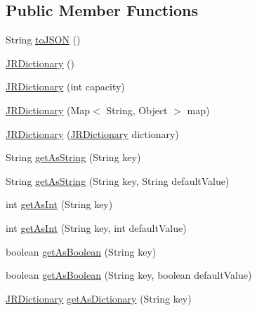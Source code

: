 \subsection*{Public Member Functions}
\begin{DoxyCompactItemize}
\item 
String \hyperlink{classcom_1_1janrain_1_1android_1_1engage_1_1types_1_1_j_r_dictionary_a693608dec873ba750e1bf45f50d81817}{toJSON} ()
\item 
\hyperlink{classcom_1_1janrain_1_1android_1_1engage_1_1types_1_1_j_r_dictionary_a3d6b06229461e0972db38b25eae82c53}{JRDictionary} ()
\item 
\hyperlink{classcom_1_1janrain_1_1android_1_1engage_1_1types_1_1_j_r_dictionary_a80ee8f20b3006ddfbbaeee16fcc9cef4}{JRDictionary} (int capacity)
\item 
\hyperlink{classcom_1_1janrain_1_1android_1_1engage_1_1types_1_1_j_r_dictionary_a183efe63560b320550b6ee928ae3c7f1}{JRDictionary} (Map$<$ String, Object $>$ map)
\item 
\hyperlink{classcom_1_1janrain_1_1android_1_1engage_1_1types_1_1_j_r_dictionary_a4bc06064c7df37c2a110ec67785942d7}{JRDictionary} (\hyperlink{classcom_1_1janrain_1_1android_1_1engage_1_1types_1_1_j_r_dictionary}{JRDictionary} dictionary)
\item 
String \hyperlink{classcom_1_1janrain_1_1android_1_1engage_1_1types_1_1_j_r_dictionary_aa658996dc3ad784535daf3c877006496}{getAsString} (String key)
\item 
String \hyperlink{classcom_1_1janrain_1_1android_1_1engage_1_1types_1_1_j_r_dictionary_af532552e3bacf033ede4b38388575763}{getAsString} (String key, String defaultValue)
\item 
int \hyperlink{classcom_1_1janrain_1_1android_1_1engage_1_1types_1_1_j_r_dictionary_ac63bf7999f4c6cd32eff4bb21dd41eae}{getAsInt} (String key)
\item 
int \hyperlink{classcom_1_1janrain_1_1android_1_1engage_1_1types_1_1_j_r_dictionary_aee5a70494e7163fa1cdee66df51b90ae}{getAsInt} (String key, int defaultValue)
\item 
boolean \hyperlink{classcom_1_1janrain_1_1android_1_1engage_1_1types_1_1_j_r_dictionary_a21316c4269c7b15e172aa48e1c7dc883}{getAsBoolean} (String key)
\item 
boolean \hyperlink{classcom_1_1janrain_1_1android_1_1engage_1_1types_1_1_j_r_dictionary_a983d6d591c054d5c6fc0cd359f584d04}{getAsBoolean} (String key, boolean defaultValue)
\item 
\hyperlink{classcom_1_1janrain_1_1android_1_1engage_1_1types_1_1_j_r_dictionary}{JRDictionary} \hyperlink{classcom_1_1janrain_1_1android_1_1engage_1_1types_1_1_j_r_dictionary_a21cc44cc5264cee8252891600b28e669}{getAsDictionary} (String key)

\end{DoxyCompactItemize}
